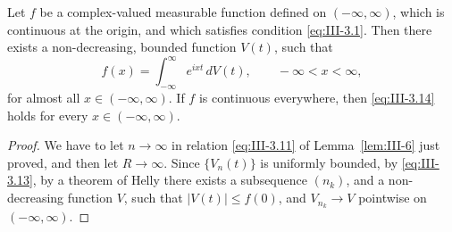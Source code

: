 \begin{theorem}\label{thm:III-5}
Let $f$ be a complex-valued measurable function defined on $(-\infty,\infty)$, which is continuous at the origin, and which satisfies condition \eqref{eq:III-3.1}. Then there exists a non-decreasing, bounded function $V(t)$, such that
\begin{equation}\tag{3.14}\label{eq:III-3.14}
f(x)=\int_{-\infty}^{\infty}e^{ixt}\,dV(t),\qquad-\infty<x<\infty,
\end{equation}
for almost all $x\in(-\infty,\infty)$. If $f$ is continuous everywhere, then \eqref{eq:III-3.14} holds for every $x\in(-\infty,\infty)$.
\end{theorem}

\begin{proof}
We have to let $n\to\infty$ in relation \eqref{eq:III-3.11} of Lemma~\ref{lem:III-6} just proved, and then let $R\to\infty$. Since $\{V_{n}(t)\}$ is uniformly bounded, by \eqref{eq:III-3.13}, by a theorem of Helly there exists a subsequence $(n_{k})$, and a non-decreasing function $V$, such that $|V(t)|\le f(0)$, and $V_{n_{k}}\to V$ pointwise on $(-\infty,\infty)$.


\end{proof}
